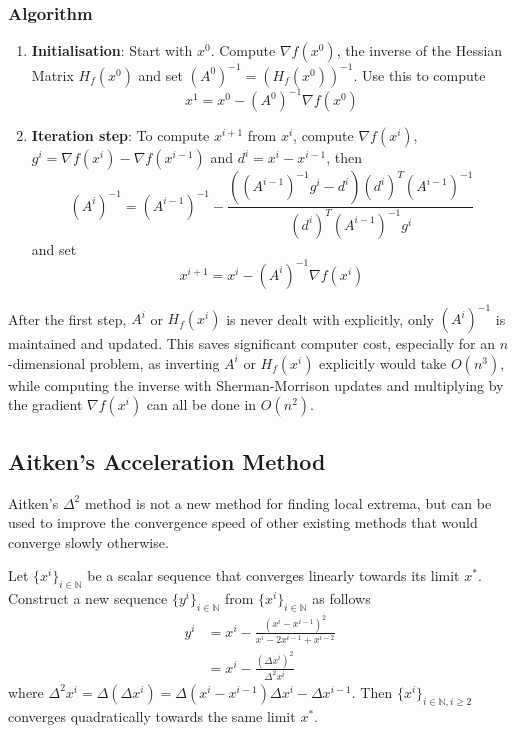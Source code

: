 \documentclass[11pt]{article}
\begin{document}
\subsubsection{Algorithm}
\begin{enumerate}
	\item \textbf{Initialisation}: Start with $x^0$. Compute $\nabla f(x^0)$, the inverse of the Hessian Matrix $H_f(x^0)$ and set $(A^0)^{-1} = \left(H_f(x^0)\right)^{-1} $. Use this to compute
	\begin{equation*}
		x^1 = x^0 - (A^0)^{-1}\nabla f(x^0)
	\end{equation*}
	\item \textbf{Iteration step}: To compute $x^{i+1}$ from $x^i$, compute $\nabla f(x^i)$, $g^i = \nabla f(x^i) - \nabla f(x^{i-1})$ and $d^i = x^i - x^{i-1}$, then
	\begin{equation*}
		(A^{i})^{-1} = (A^{i-1})^{-1} - \frac{\left((A^{i-1})^{-1}g^i-d^i\right)(d^i)^T(A^{i-1})^{-1}}{(d^i)^T(A^{i-1})^{-1}g^i}
	\end{equation*}
	and set
	\begin{equation*}
		x^{i+1} = x^i - (A^i)^{-1} \nabla f(x^i)
	\end{equation*}
\end{enumerate}

After the first step, $A^i$ or $H_f(x^i)$ is never dealt with explicitly, only $(A^i)^{-1}$ is maintained and updated. This saves significant computer cost, especially for an $n$-dimensional problem, as inverting $A^i$ or $ H_f(x^i)$ explicitly would take $O(n^3)$, while computing the inverse with Sherman-Morrison updates and multiplying by the gradient $\nabla f(x^i)$ can all be done in $O(n^2)$.

\subsection{Aitken's Acceleration Method}
Aitken's $\Delta^2$ method is not a new method for finding local extrema, but can be used to improve the convergence speed of other existing methods that would converge slowly otherwise.

Let $\{x^i\}_{i\in\mathbb{N}}$ be a scalar sequence that converges linearly towards its limit $x^*$. Construct a new sequence $\{y^i\}_{i\in\mathbb{N}}$ from $\{x^i\}_{i\in\mathbb{N}}$ as follows
\begin{align*}
y^i &= x^i - \frac{(x^i - x^{i-1})^2}{x^i - 2x^{i-1} + x^{i-2}}\\
&= x^i - \frac{(\Delta x^i)^2}{\Delta^2 x^i}
\end{align*}
where $\Delta^2 x^i = \Delta(\Delta x^i) = \Delta(x^i - x^{i-1}) \Delta x^i - \Delta x^{i-1}$. Then $\{x^i\}_{i\in\mathbb{N}, i\geq 2}$ converges quadratically towards the same limit $x^*$.
\end{document}

